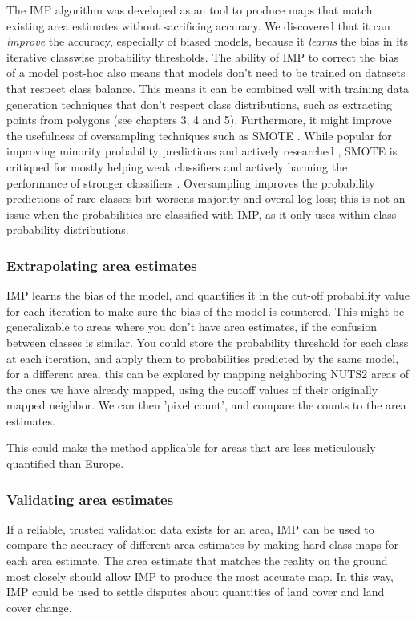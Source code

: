         The IMP algorithm was developed as an tool to produce maps that match existing area estimates without sacrificing accuracy. We discovered that it can \textit{improve} the accuracy, especially of biased models, because it \textit{learns} the bias in its iterative classwise probability thresholds. The ability of IMP to correct the bias of a model post-hoc also means that models don't need to be trained on datasets that respect class balance. This means it can be combined well with training data generation techniques that don't respect class distributions, such as extracting points from polygons (see chapters 3, 4 and 5). Furthermore, it might improve the usefulness of oversampling techniques such as SMOTE  \citep{chawla2002smote}. While popular for improving minority probability predictions \citep{elor2022smote} and actively researched \citep{douzas2019imbalanced}, SMOTE is critiqued for mostly helping weak classifiers and actively harming the performance of stronger classifiers \citep{elor2022smote}. Oversampling improves the probability predictions of rare classes but worsens majority and overal log loss; this is not an issue when the probabilities are classified with IMP, as it only uses within-class probability distributions.

        \subsubsection{Extrapolating area estimates}
            IMP learns the bias of the model, and quantifies it in the cut-off probability value for each iteration to make sure the bias of the model is countered. This might be generalizable to areas where you don't have area estimates, if the confusion between classes is similar.
            You could store the probability threshold for each class at each iteration, and apply them to probabilities predicted by the same model, for a different area.
            this can be explored by mapping neighboring NUTS2 areas of the ones we have already mapped, using the cutoff values of their originally mapped neighbor. We can then 'pixel count', and compare the counts to the area estimates.

            This could make the method applicable for areas that are less meticulously quantified than Europe.
        
        \subsubsection{Validating area estimates}
            If a reliable, trusted validation data exists for an area, IMP can be used to compare the accuracy of different area estimates by making hard-class maps for each area estimate. The area estimate that matches the reality on the ground most closely should allow IMP to produce the most accurate map.
            In this way, IMP could be used to settle disputes about quantities of land cover and land cover change.

